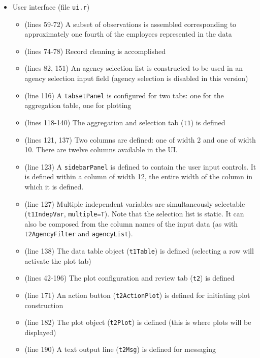\documentclass[10pt, letterpaper]{article}
\begin{document}
\begin{spacing}{1.0}
\begin{itemize}

    \item User interface (file \texttt{ui.r})
      \begin{itemize}
        \item (lines 59-72) A subset of observations is assembled corresponding to approximately one fourth of the employees represented in the data
        \item (lines 74-78) Record cleaning is accomplished
        \item (lines 82, 151) An agency selection list is constructed to be used in an agency selection input field (agency selection is disabled in this version)
        \item (line 116) A \texttt{tabsetPanel} is configured for two tabs:  one for the aggregation table, one for plotting
        \item (lines 118-140) The aggregation and selection tab (\texttt{t1}) is defined
        \item (lines 121, 137) Two columns are defined:  one of width 2 and one of width 10.  There are twelve  columns available in the UI.
        \item (line 123) A \texttt{sidebarPanel} is defined to contain the user input controls.  It is defined within a column of width 12, the entire width of the column in which it is defined. 
        \item (line 127) Multiple independent variables are simultaneously selectable (\texttt{t1IndepVar}, \texttt{multiple=T}).  Note that the selection list is static.  It can also be composed from the column names of the input data (as with \texttt{t2AgencyFilter} and \texttt{agencyList}).
        \item (line 138) The data table object (\texttt{t1Table}) is defined (selecting a row will activate the plot tab)
        \item (lines 42-196) The plot configuration and review tab (\texttt{t2}) is defined
        \item (line 171) An action button (\texttt{t2ActionPlot}) is defined for initiating plot construction
        \item (line 182) The plot object (\texttt{t2Plot}) is defined (this is where plots will be displayed)
        \item (line 190) A text output line (\texttt{t2Msg}) is defined for messaging
      \end{itemize}


\end{itemize}
\end{spacing}
\end{document}
